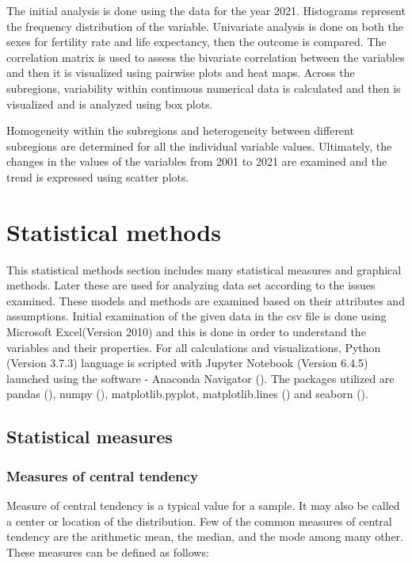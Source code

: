 \documentclass[12 pt]{scrartcl}
\begin{document}
	The initial analysis is done using the data for the year 2021. Histograms represent the frequency distribution of the variable. Univariate analysis is done on both the sexes for fertility rate and life expectancy, then the outcome is compared. The correlation matrix is used to assess the bivariate correlation between the variables and then it is visualized using pairwise plots and heat maps. Across the subregions, variability within continuous numerical data is calculated and then is visualized and is analyzed using box plots.
	
	Homogeneity within the subregions and heterogeneity between different subregions are determined for all the individual variable values. Ultimately, the changes in the values of the variables from 2001 to 2021 are examined and the trend is expressed using scatter plots.
	
	
	\section{Statistical methods}
	This statistical methods section includes many statistical measures and graphical methods. Later these are used for analyzing data set according to the issues examined. These models and methods are examined based on their attributes and assumptions. Initial examination of the given data in the csv file is done using Microsoft Excel(Version 2010) and this is done in order to understand the variables and their properties. For all calculations and visualizations, Python (Version 3.7.3) language is scripted with Jupyter Notebook (Version 6.4.5) launched using the software - Anaconda Navigator (\cite{python}). The packages utilized are pandas (\cite{pandas}), numpy (\cite{numpy}), matplotlib.pyplot, matplotlib.lines (\cite{matplotlib}) and seaborn (\cite{seaborn}).
	
	
	
	\subsection{Statistical measures}
	\subsubsection{Measures of central tendency}
	
	Measure of central tendency is a typical value for a sample. It may also be called a center or location of the distribution. Few of the common measures of central tendency are the arithmetic mean, the median, and the mode among many other. These measures can be defined as follows:
	
\end{document}
